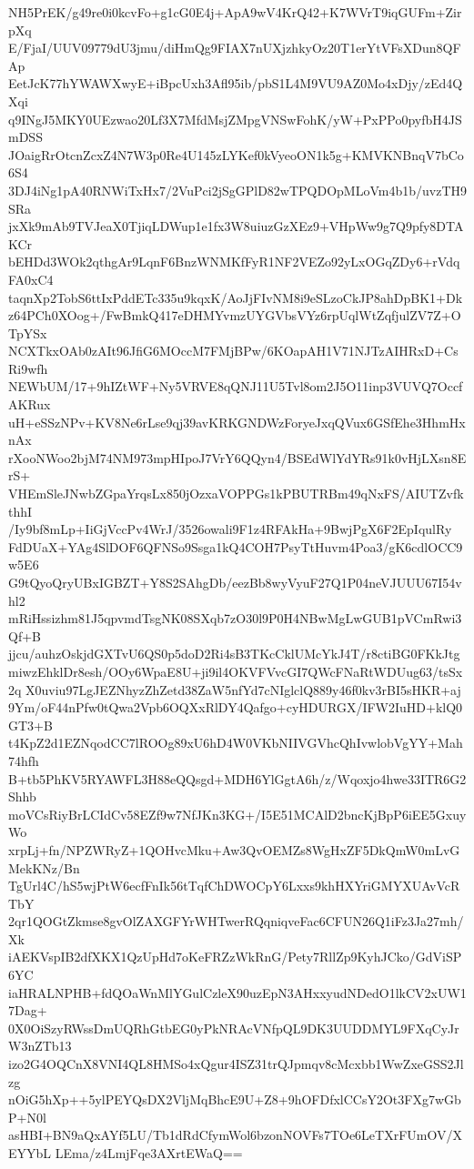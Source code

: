 NH5PrEK/g49re0i0kcvFo+g1cG0E4j+ApA9wV4KrQ42+K7WVrT9iqGUFm+ZirpXq
E/FjaI/UUV09779dU3jmu/diHmQg9FIAX7nUXjzhkyOz20T1erYtVFsXDun8QFAp
EetJcK77hYWAWXwyE+iBpcUxh3Afl95ib/pbS1L4M9VU9AZ0Mo4xDjy/zEd4QXqi
q9INgJ5MKY0UEzwao20Lf3X7MfdMsjZMpgVNSwFohK/yW+PxPPo0pyfbH4JSmDSS
JOaigRrOtcnZcxZ4N7W3p0Re4U145zLYKef0kVyeoON1k5g+KMVKNBnqV7bCo6S4
3DJ4iNg1pA40RNWiTxHx7/2VuPci2jSgGPlD82wTPQDOpMLoVm4b1b/uvzTH9SRa
jxXk9mAb9TVJeaX0TjiqLDWup1e1fx3W8uiuzGzXEz9+VHpWw9g7Q9pfy8DTAKCr
bEHDd3WOk2qthgAr9LqnF6BnzWNMKfFyR1NF2VEZo92yLxOGqZDy6+rVdqFA0xC4
taqnXp2TobS6ttIxPddETc335u9kqxK/AoJjFIvNM8i9eSLzoCkJP8ahDpBK1+Dk
z64PCh0XOog+/FwBmkQ417eDHMYvmzUYGVbsVYz6rpUqlWtZqfjulZV7Z+OTpYSx
NCXTkxOAb0zAIt96JfiG6MOccM7FMjBPw/6KOapAH1V71NJTzAIHRxD+CsRi9wfh
NEWbUM/17+9hIZtWF+Ny5VRVE8qQNJ11U5Tvl8om2J5O11inp3VUVQ7OccfAKRux
uH+eSSzNPv+KV8Ne6rLse9qj39avKRKGNDWzForyeJxqQVux6GSfEhe3HhmHxnAx
rXooNWoo2bjM74NM973mpHIpoJ7VrY6QQyn4/BSEdWlYdYRs91k0vHjLXsn8ErS+
VHEmSleJNwbZGpaYrqsLx850jOzxaVOPPGs1kPBUTRBm49qNxFS/AIUTZvfkthhI
/Iy9bf8mLp+IiGjVccPv4WrJ/3526owali9F1z4RFAkHa+9BwjPgX6F2EpIqulRy
FdDUaX+YAg4SlDOF6QFNSo9Ssga1kQ4COH7PsyTtHuvm4Poa3/gK6cdlOCC9w5E6
G9tQyoQryUBxIGBZT+Y8S2SAhgDb/eezBb8wyVyuF27Q1P04neVJUUU67I54vhl2
mRiHssizhm81J5qpvmdTsgNK08SXqb7zO30l9P0H4NBwMgLwGUB1pVCmRwi3Qf+B
jjcu/auhzOskjdGXTvU6QS0p5doD2Ri4sB3TKcCklUMcYkJ4T/r8ctiBG0FKkJtg
miwzEhklDr8esh/OOy6WpaE8U+ji9il4OKVFVvcGI7QWcFNaRtWDUug63/tsSx2q
X0uviu97LgJEZNhyzZhZetd38ZaW5nfYd7cNIglclQ889y46f0kv3rBI5sHKR+aj
9Ym/oF44nPfw0tQwa2Vpb6OQXxRlDY4Qafgo+cyHDURGX/IFW2IuHD+klQ0GT3+B
t4KpZ2d1EZNqodCC7lROOg89xU6hD4W0VKbNIIVGVhcQhIvwlobVgYY+Mah74hfh
B+tb5PhKV5RYAWFL3H88eQQsgd+MDH6YlGgtA6h/z/Wqoxjo4hwe33ITR6G2Shhb
moVCsRiyBrLCIdCv58EZf9w7NfJKn3KG+/I5E51MCAlD2bncKjBpP6iEE5GxuyWo
xrpLj+fn/NPZWRyZ+1QOHvcMku+Aw3QvOEMZs8WgHxZF5DkQmW0mLvGMekKNz/Bn
TgUrl4C/hS5wjPtW6ecfFnIk56tTqfChDWOCpY6Lxxs9khHXYriGMYXUAvVcRTbY
2qr1QOGtZkmse8gvOlZAXGFYrWHTwerRQqniqveFac6CFUN26Q1iFz3Ja27mh/Xk
iAEKVspIB2dfXKX1QzUpHd7oKeFRZzWkRnG/Pety7RllZp9KyhJCko/GdViSP6YC
iaHRALNPHB+fdQOaWnMlYGulCzleX90uzEpN3AHxxyudNDedO1lkCV2xUW17Dag+
0X0OiSzyRWssDmUQRhGtbEG0yPkNRAcVNfpQL9DK3UUDDMYL9FXqCyJrW3nZTb13
izo2G4OQCnX8VNI4QL8HMSo4xQgur4ISZ31trQJpmqv8cMcxbb1WwZxeGSS2Jlzg
nOiG5hXp++5ylPEYQsDX2VljMqBhcE9U+Z8+9hOFDfxlCCsY2Ot3FXg7wGbP+N0l
asHBI+BN9aQxAYf5LU/Tb1dRdCfymWol6bzonNOVFs7TOe6LeTXrFUmOV/XEYYbL
LEma/z4LmjFqe3AXrtEWaQ==
